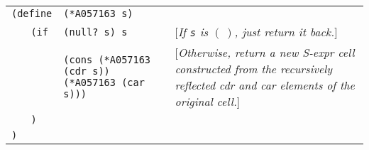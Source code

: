 \documentclass[11pt]{article} %
\newcommand{\scmsym}[1]{{\tt{#1}}}
\newcommand{\scmcode}[1]{{\tt{#1}}}
\newenvironment{scmdefinefun5}{\begin{tabular}{l l l l p{5cm}}}{\end{tabular}}
\newcommand{\scmexmcomment}[1]{[\emph{#1}]}
\newcommand{\nilatom}{\ensuremath{\mathbf{(~)}}\xspace}
\begin{document}
\begin{scmdefinefun5}

\multicolumn{2}{l}{\scmcode{(define}} & \multicolumn{2}{l}{\scmcode{(*A057163 s)}}\\
 & \scmcode{(if} & \multicolumn{2}{l}{\scmcode{(null? s) s}}
 & \scmexmcomment{If \scmsym{s} is \nilatom, just return it back.}\\
 &               & \multicolumn{2}{l}{\scmcode{(cons (*A057163 (cdr s)) (*A057163 (car s)))}}
& \scmexmcomment{Otherwise, return a new S-expr cell constructed from the recursively reflected cdr and car elements of the original cell.}\\
& \scmcode{)}\\
\scmcode{)}\\

\end{scmdefinefun5}
\end{document}
